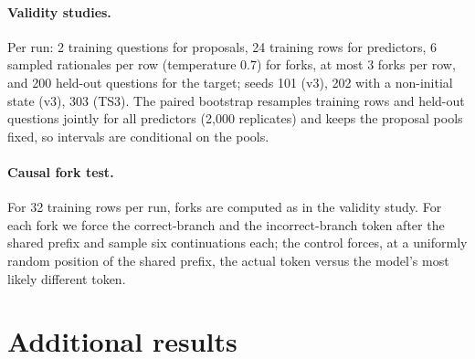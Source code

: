 \documentclass{article}
\begin{document}
\paragraph{Validity studies.} Per run: 2 training questions for proposals, 24 training
rows for predictors, 6 sampled rationales per row (temperature 0.7) for forks, at most 3
forks per row, and 200 held-out questions for the target; seeds 101 (v3), 202 with a
non-initial state (v3), 303 (TS3). The paired bootstrap resamples training rows and
held-out questions jointly for all predictors (2{,}000 replicates) and keeps the proposal
pools fixed, so intervals are conditional on the pools.

\paragraph{Causal fork test.} For 32 training rows per run, forks are computed as in the
validity study. For each fork we force the correct-branch and the incorrect-branch token
after the shared prefix and sample six continuations each; the control forces, at a
uniformly random position of the shared prefix, the actual token versus the model's most
likely different token.

\section{Additional results}
\label{app:results}

\begin{table}[h]
\centering
\caption{\textbf{Token-level validity control:} single-token substitutions drawn from the
model's top-10 next tokens ($^t$), same rows and held-out questions as the block runs
LD7/TS7 with seed 101. Columns as in Table~\ref{tab:validity}.}
\label{tab:validity-token}
\resizebox{0.92\textwidth}{!}{}
\end{table}
\end{document}
